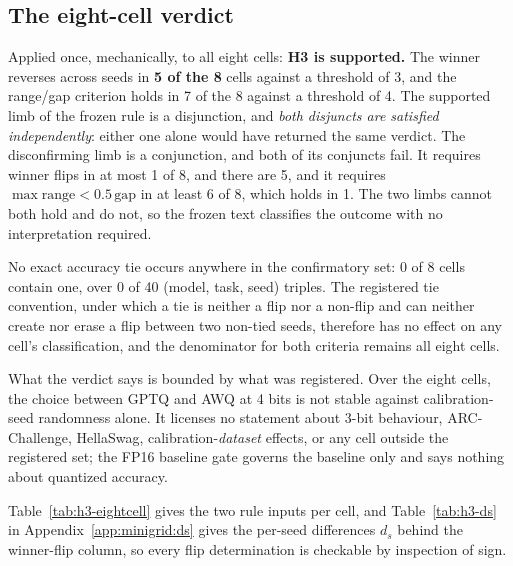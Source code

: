\subsection{The eight-cell verdict}
\label{sec:minigrid:verdict}

Applied once, mechanically, to all eight cells:
\textbf{H3 is supported.} The winner reverses across seeds in \textbf{5 of the 8}
cells against a threshold of 3, and the range/gap criterion holds in
7 of the 8 against a threshold of 4. The supported limb of the frozen
rule is a disjunction, and \emph{both disjuncts are satisfied independently}:
either one alone would have returned the same verdict. The disconfirming limb is
a conjunction, and both of its conjuncts fail. It requires winner flips in at
most 1 of 8, and there are 5, and it requires
$\max\mathrm{range} < 0.5\,\mathrm{gap}$ in at least 6 of 8, which holds in 1.
The two limbs cannot both hold and do not, so the frozen text classifies the
outcome with no interpretation required.

No exact accuracy tie occurs anywhere in the confirmatory set: 0 of 8
cells contain one, over 0 of 40 (model, task, seed) triples. The
registered tie convention, under which a tie is neither a flip nor a non-flip
and can neither create nor erase a flip between two non-tied seeds, therefore has no
effect on any cell's classification, and the denominator for both criteria
remains all eight cells.

What the verdict says is bounded by what was registered. Over the eight cells,
the choice between GPTQ and AWQ at 4 bits is not stable against
calibration-seed randomness alone. It licenses no statement about 3-bit
behaviour, ARC-Challenge, HellaSwag, calibration-\emph{dataset} effects, or any
cell outside the registered set; the FP16 baseline gate governs the baseline
only and says nothing about quantized accuracy.

Table~\ref{tab:h3-eightcell} gives the two rule inputs per cell, and
Table~\ref{tab:h3-ds} in Appendix~\ref{app:minigrid:ds} gives the per-seed
differences $d_s$ behind the winner-flip column, so every flip determination is
checkable by inspection of sign.

